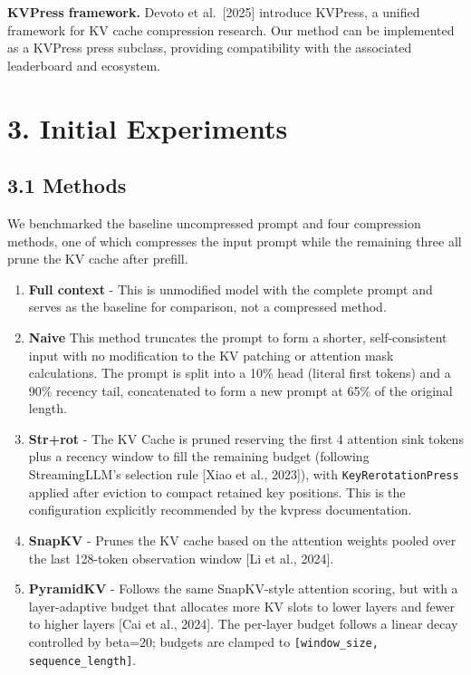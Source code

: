 \documentclass[10pt,letterpaper]{article}
\begin{document}
\textbf{KVPress framework.} Devoto et al.~{[}2025{]} introduce KVPress,
a unified framework for KV cache compression research. Our method can be
implemented as a KVPress press subclass, providing compatibility with
the associated leaderboard and ecosystem.

\hypertarget{initial-experiments}{%
\section{3. Initial Experiments}\label{initial-experiments}}

\hypertarget{methods}{%
\subsection{3.1 Methods}\label{methods}}

We benchmarked the baseline uncompressed prompt and four  compression methods, 
one of which compresses the input prompt while the remaining three all prune the KV
cache after prefill.

\begin{enumerate}
\item 
\textbf{Full context} - This is unmodified model with the
complete prompt and serves as the baseline for comparison, not a compressed method.

\item
\textbf{Naive} This method truncates the prompt
to form a shorter, self-consistent input with no modification to the KV patching or
attention mask calculations. The prompt is split into a 10\% head (literal first tokens)
and a 90\% recency tail, concatenated to form a new prompt at 65\% of
the original length.

\item
\textbf{Str+rot} - The KV Cache is pruned reserving the first 4 attention sink tokens plus a
recency window to fill the remaining budget (following StreamingLLM’s selection rule
[Xiao et al., 2023]), with \texttt{KeyRerotationPress} applied after eviction to compact
retained key positions. This is the configuration explicitly recommended by the kvpress
documentation.

\item
\textbf{SnapKV} - Prunes the KV cache based on the attention weights pooled over the last 128-token
  observation window {[}Li et al., 2024{]}.

\item
\textbf{PyramidKV} - Follows the same SnapKV-style attention scoring, but with a layer-adaptive
budget that allocates more KV slots to lower layers and fewer to higher layers [Cai et al., 2024].
The per-layer budget follows a linear decay controlled by beta=20; budgets are clamped to
\texttt{[window\_size, sequence\_length]}.

\end{enumerate}
\end{document}
